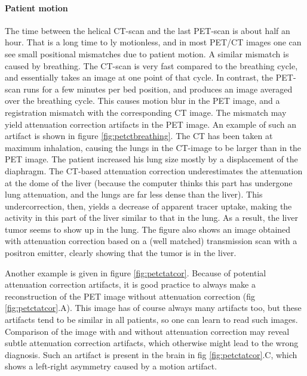 \documentclass[11pt,oneside]{article}
\begin{document}
\paragraph{Patient motion}
The time between the helical CT-scan and the last PET-scan is about half an
hour. That is a long time to ly motionless, and in most PET/CT images one can
see small positional mismatches due to patient motion. A similar mismatch is
caused by breathing. The CT-scan is very fast compared to the breathing cycle,
and essentially takes an image at one point of that cycle. In contrast, the
PET-scan runs for a few minutes per bed position, and produces an image
averaged over the breathing cycle. This causes motion blur in the PET image,
and a registration mismatch with the corresponding CT image. The mismatch may
yield attenuation correction artifacts in the PET image. An example of such an
artifact is shown in figure \ref{fig:petctbreathing}. The CT has been taken at
maximum inhalation, causing the lungs in the CT-image to be larger than in the
PET image. The patient increased his lung size mostly by a displacement of the
diaphragm. The CT-based attenuation correction underestimates the attenuation
at the dome of the liver (because the computer thinks this part has undergone
lung attenuation, and the lungs are far less dense than the liver). This
undercorrection, then, yields a decrease of apparent tracer uptake, making the
activity in this part of the liver similar to that in the lung. As a result,
the liver tumor seems to show up in the lung. The figure also shows an image
obtained with attenuation correction based on a (well matched) transmission
scan with a positron emitter, clearly showing that the tumor is in the
liver.

Another example is given in figure \ref{fig:petctatcor}. Because of
potential attenuation correction artifacts, it is good practice to
always make a reconstruction of the PET image without attenuation
correction (fig \ref{fig:petctatcor}.A). This image has of course
always many artifacts too, but these artifacts tend to be similar in all
patients, so one can learn to read such images. Comparison of the
image with and without attenuation correction may reveal subtle
attenuation correction artifacts, which otherwise might lead to the
wrong diagnosis. Such an artifact is present in the brain in fig
\ref{fig:petctatcor}.C, which shows a left-right asymmetry caused by a
motion artifact.
\end{document}
